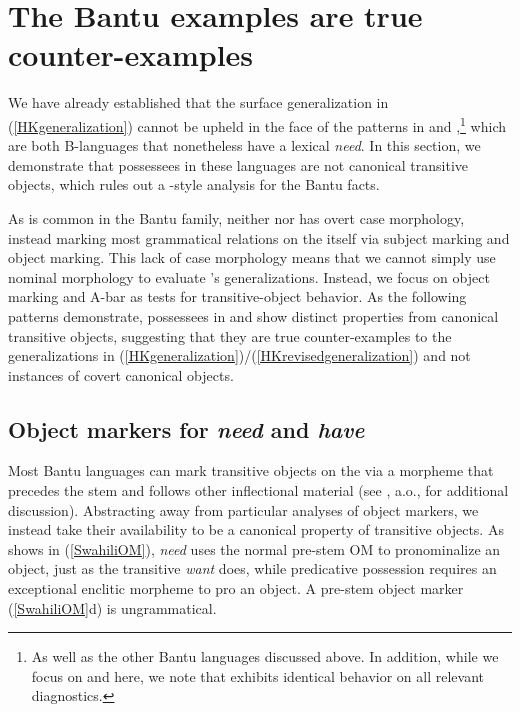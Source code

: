 \documentclass[output=paper,
modfonts
]{langscibook}
\begin{document}
\section{The Bantu examples are true counter-examples} \label{Zulu-Swahili}

We have already established that the surface generalization in
(\ref{HKgeneralization}) cannot be upheld in the face of the patterns
in  and ,\footnote{As well as the other Bantu languages discussed above. In addition, while we focus on  and  here, we note that  exhibits identical behavior on all relevant diagnostics.} which are both B-languages
that nonetheless have a lexical  {\it need}. %
 In this section, we
demonstrate that possessees in these languages are not canonical
transitive objects, which rules out a -style analysis for the
Bantu facts. %

As is common in the Bantu family, neither  nor  has overt case morphology, instead marking most grammatical relations on the 
itself via subject marking and object marking. This lack of case
morphology means that we cannot simply use nominal morphology to
evaluate  \citet{Harves:2012}'s generalizations. Instead, we focus on object marking
and A-bar  as tests for transitive-object behavior. As  the
following patterns demonstrate,  possessees in  and  show
distinct properties from canonical  transitive objects, suggesting
that they are true counter-examples to  the generalizations in
(\ref{HKgeneralization})/(\ref{HKrevisedgeneralization}) and not
instances of covert canonical objects.

\subsection{Object markers for {\it need} and {\it have}}
Most Bantu languages can mark transitive objects on the  via a
morpheme  that precedes the stem and follows other inflectional
material (see \citealt{Riedel:2009,Marten:2007,Zeller:2012,Bax:2012}, a.o., for additional discussion). Abstracting
away from particular analyses of object markers, we instead take their availability to be a canonical property of transitive
objects. As  shows in (\ref{SwahiliOM}), {\it need}
uses the normal pre-stem OM to pronominalize an object, just as the transitive  {\it want} does, while
predicative possession requires an exceptional enclitic morpheme to
pro an object. A pre-stem object marker (\ref{SwahiliOM}d) is ungrammatical.
\end{document}
